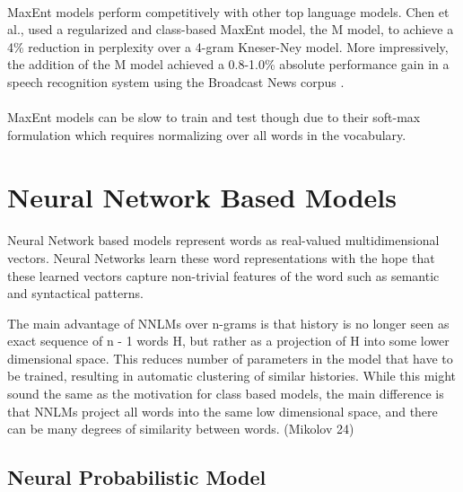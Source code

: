 \documentclass[12pt]{ociamthesis}
\begin{document}
\paragraph{}
MaxEnt models perform competitively with other top language models. Chen et al., used a regularized and class-based MaxEnt model, the M model, to achieve a 4\% reduction in perplexity over a 4-gram Kneser-Ney model. More impressively, the addition of the M model achieved a 0.8-1.0\% absolute performance gain in a speech recognition system using the Broadcast News corpus \cite{Chen2009}.
\paragraph{}
MaxEnt models can be slow to train and test though due to their soft-max formulation which requires normalizing over all words in the vocabulary.

\section{Neural Network Based Models}
\paragraph{}
Neural Network based models represent words as real-valued multidimensional vectors. Neural Networks learn these word representations with the hope that these learned vectors capture non-trivial features of the word such as semantic and syntactical patterns.

The main advantage of NNLMs over n-grams is that history is no longer seen as exact sequence of n - 1 words H, but rather as a projection of H into some lower dimensional space. This reduces number of parameters in the model that have to be trained, resulting in automatic clustering of similar histories. While this might sound the same as the motivation for class based models, the main difference is that NNLMs project all words into the same low dimensional space, and there can be many degrees of similarity between words. (Mikolov 24)

\subsection{Neural Probabilistic Model}
\end{document}
